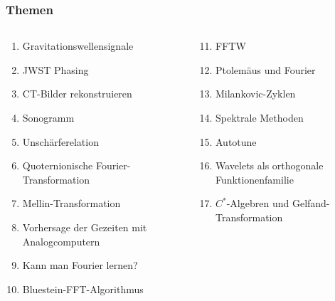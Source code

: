 %
%
%
\bgroup
\begin{frame}[t]
\setlength{\abovedisplayskip}{5pt}
\setlength{\belowdisplayskip}{5pt}
\frametitle{Themen}
\vspace{-20pt}
\begin{columns}[t,onlytextwidth]
\begin{column}{0.48\textwidth}
\begin{enumerate}
\item<2-> Gravitationswellensignale
\item<3-> JWST Phasing
\item<4-> CT-Bilder rekonstruieren
\item<5-> Sonogramm
\item<6-> Unschärferelation
\item<7-> Quoternionische Fourier-Transformation
\item<8-> Mellin-Transformation
\item<9-> Vorhersage der Gezeiten mit Analogcomputern
\item<10-> Kann man Fourier lernen?
\item<11-> Bluestein-FFT-Algorithmus
\end{enumerate}
\end{column}
\begin{column}{0.48\textwidth}
\begin{enumerate}
\setcounter{enumi}{10}
\item<12-> FFTW
\item<13-> Ptolemäus und Fourier
\item<14-> Milankovic-Zyklen
\item<15-> Spektrale Methoden
\item<16-> Autotune
\item<17-> Wavelets als orthogonale Funktionenfamilie
\item<18-> $C^*$-Algebren und Gelfand-Transformation
\end{enumerate}
\end{column}
\end{columns}
\end{frame}
\egroup
